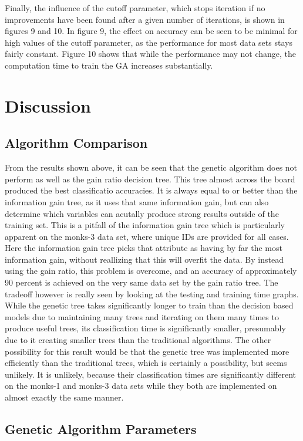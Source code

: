 \documentclass[12pt, letterpaper]{article}
\begin{document}
Finally, the influence of the cutoff parameter, which stops iteration if no
improvements have been found after a given number of iterations, is shown in
figures 9 and 10. In figure 9, the effect on accuracy can be seen to be minimal
for high values of the cutoff parameter, as the performance for most data sets
stays fairly constant. Figure 10 shows that while the performance may not 
change, the computation time to train the GA increases substantially.    


\section{Discussion}
\subsection{Algorithm Comparison}
From the results shown above, it can be seen that the genetic algorithm does not
perform as well as the gain ratio decision tree.  This tree almost across the
board produced the best classificatio accuracies.  It is always equal to or
better than the information gain tree, as it uses that same information gain,
but can also determine which variables can acutally produce strong results 
outside of the training set. This is a pitfall of the information gain tree
which is particularly apparent on the monks-3 data set, where unique IDs are 
provided for all cases.  Here the information gain tree picks that attribute
as having by far the most information gain, without reallizing that this will
overfit the data.  By instead using the gain ratio, this problem is overcome, 
and an accuracy of approximately 90 percent is achieved on the very same data
set by the gain ratio tree. The tradeoff however is really seen by looking at
the testing and training time graphs. While the genetic tree takes significantly
longer to train than the decision based models due to maintaining many trees and
iterating on them many times to produce useful trees, its classification time
is significantly smaller, presumably due to it creating smaller trees than the
traditional algorithms.  The other possibility for this result would be that 
the genetic tree was implemented more efficiently than the traditional trees,
which is certainly a possibility, but seems unlikely.  It is unlikely, because
their classification times are significantly different on the monks-1 and 
monks-3 data sets while they both are implemented on almost exactly the same
manner.  
\subsection{Genetic Algorithm Parameters}
\end{document}
